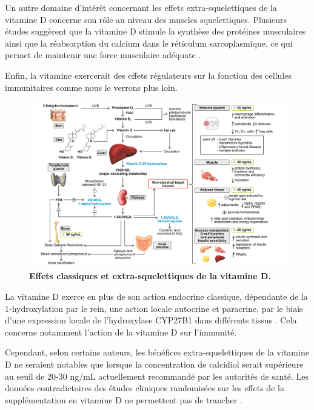 \documentclass[
  a4paper,
  DIV=11,
  numbers=noendperiod,
  listof=totoc]{scrreprt}
\begin{document}
Un autre domaine d'intérêt concernant les effets extra-squelettiques de
la vitamine D concerne son rôle au niveau des muscles squelettiques.
Plusieurs études suggèrent que la vitamine D stimule la synthèse des
protéines musculaires ainsi que la réabsorption du calcium dans le
réticulum sarcoplasmique, ce qui permet de maintenir une force
musculaire adéquate \autocite{Caprio.2017}.

Enfin, la vitamine exercerait des effets régulateurs sur la fonction des
cellules immunitaires comme nous le verrons plus loin.

\begin{landscape}
\begin{figure}
\includegraphics{figures/extra-skeletal-effect.png} 
\caption[Effets classiques et extra-squelettiques de la vitamine D.]
{\textbf{Effets classiques et extra-squelettiques de la vitamine D.} \textcite{Caprio.2017}}
\label{fig:extra-skeletal}
\end{figure}
\end{landscape}

La vitamine D exerce en plus de son action endocrine classique,
dépendante de la 1-hydroxylation par le rein, une action locale
autocrine et paracrine, par le biais d'une expression locale de
l'hydroxylase \ac{CYP27B1} dans différents tissus
\autocite{Carmeliet.2015,Cannell.2008}. Cela concerne notamment l'action
de la vitamine D sur l'immunité.

Cependant, selon certains auteurs, les bénéfices extra-squelettiques de
la vitamine D ne seraient notables que lorsque la concentration de
calcidiol serait supérieure au seuil de 20-30 ng/mL actuellement
recommandé par les autorités de santé. Les données contradictoires des
études cliniques randomisées sur les effets de la supplémentation en
vitamine D ne permettent pas de trancher \autocites[ ]{Caprio.2017}[
]{Lewis.2015}{Bouillon.2013,Rejnmark.2017}.
\end{document}
